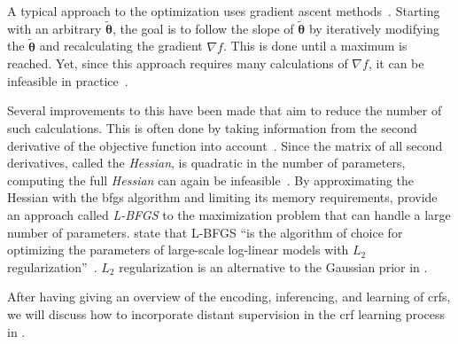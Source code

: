 \bigskip

A typical approach to the optimization uses gradient ascent methods~\citep{koller2009probabilistic}.
Starting with an arbitrary $\bm{\tilde{\theta}}$, the goal is to follow the slope of $\bm{\tilde{\theta}}$ by iteratively modifying the $\bm{\tilde{\theta}}$ and recalculating the gradient $\nabla f$.
This is done until a maximum is reached.
Yet, since this approach requires many calculations of $\nabla f$, it can be infeasible in practice~\citep{sutton2010introduction}.

Several improvements to this have been made that aim to reduce the number of such calculations.
This is often done by taking information from the second derivative of the \gls{objective function} into account~\citep{sutton2010introduction}.
Since the matrix of all second derivatives, called the \textit{Hessian}, is quadratic in the number of parameters, computing the full \textit{Hessian} can again be infeasible~\citep{sutton2010introduction}.
By approximating the Hessian with the \gls{bfgs} algorithm and limiting its memory requirements, \citet{byrd1994representations} provide an approach called \textit{L-BFGS} to the maximization problem that can handle a large number of parameters.
\citet{andrew2007scalable} state that L-BFGS ``is the algorithm of choice for optimizing the parameters of large-scale log-linear models with $L_2$ regularization''~\citep{andrew2007scalable}.
$L_2$ regularization is an alternative to the Gaussian prior in .

\bigskip

After having giving an overview of the encoding, inferencing, and learning of \glspl{crf}, we will discuss how to incorporate \gls{distant supervision} in the \gls{crf} learning process in .

